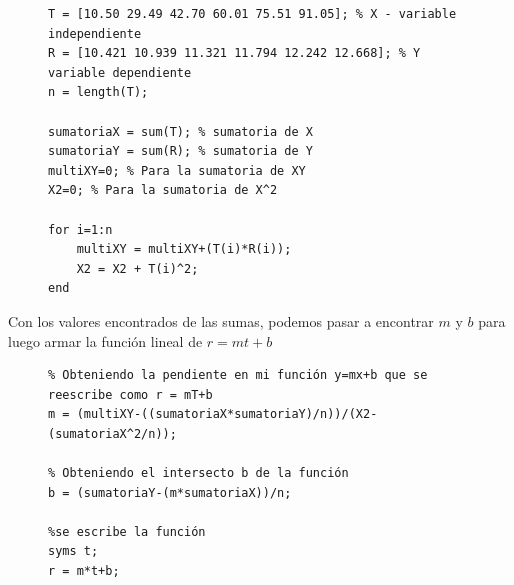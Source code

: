 \documentclass[11pt,letterpaper]{article}
\begin{document}
\begin{figure}[H]
\begin{tcolorbox}[title = Problema 1: Declaración de valores iniciales y sumatorias]
\begin{verbatim}
T = [10.50 29.49 42.70 60.01 75.51 91.05]; % X - variable independiente
R = [10.421 10.939 11.321 11.794 12.242 12.668]; % Y variable dependiente
n = length(T);

sumatoriaX = sum(T); % sumatoria de X
sumatoriaY = sum(R); % sumatoria de Y
multiXY=0; % Para la sumatoria de XY
X2=0; % Para la sumatoria de X^2

for i=1:n
    multiXY = multiXY+(T(i)*R(i));
    X2 = X2 + T(i)^2;
end
\end{verbatim}
\end{tcolorbox}
\end{figure}
Con los valores encontrados de las sumas, podemos pasar a  encontrar $m$ y $b$ para luego armar la función lineal de $r=mt + b$
\begin{figure}[H]
\begin{tcolorbox}[title = Problema 1: Armando la función lineal de aproximación]
\begin{verbatim}
% Obteniendo la pendiente en mi función y=mx+b que se reescribe como r = mT+b
m = (multiXY-((sumatoriaX*sumatoriaY)/n))/(X2-(sumatoriaX^2/n));

% Obteniendo el intersecto b de la función
b = (sumatoriaY-(m*sumatoriaX))/n;

%se escribe la función
syms t;
r = m*t+b;
\end{verbatim}
\end{tcolorbox}
\end{figure}
\end{document}
